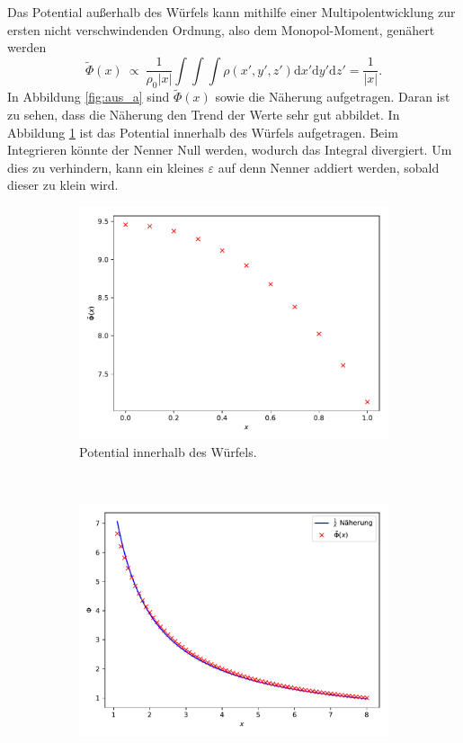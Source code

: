 Das Potential außerhalb des Würfels kann mithilfe einer Multipolentwicklung zur ersten nicht verschwindenden Ordnung, also dem Monopol-Moment, genähert werden
\begin{equation*}
  \tilde{\Phi}(x) \: \propto \: \frac{1}{\rho_0 |x|} \int \int \int \rho(x', y', z') \mathrm{d}x'\mathrm{d}y'\mathrm{d}z' = \frac{1}{|x|}.
\end{equation*}
In Abbildung \ref{fig:aus_a} sind \(\tilde{\Phi}(x)\) sowie die Näherung aufgetragen. Daran ist zu sehen, dass die Näherung den Trend der Werte sehr gut abbildet.
In Abbildung \ref{fig:inn_a} ist das Potential innerhalb des Würfels aufgetragen.
Beim Integrieren könnte der Nenner Null werden, wodurch das Integral divergiert. Um dies zu verhindern, kann ein kleines \(\varepsilon\) auf denn Nenner addiert werden, sobald dieser zu klein wird.
\begin{figure}
  \centering
  \begin{subfigure}[b]{0.45\textwidth}
      \includegraphics[width=\textwidth]{A2/build/innerhalb_a.pdf}
      \caption{Potential innerhalb des Würfels.}
      \label{fig:inn_a}
    \end{subfigure}
    ~ %
    \begin{subfigure}[b]{0.45\textwidth}
      \includegraphics[width=\textwidth]{A2/build/ausserhalb_a.pdf}

\end{subfigure}
\end{figure}
